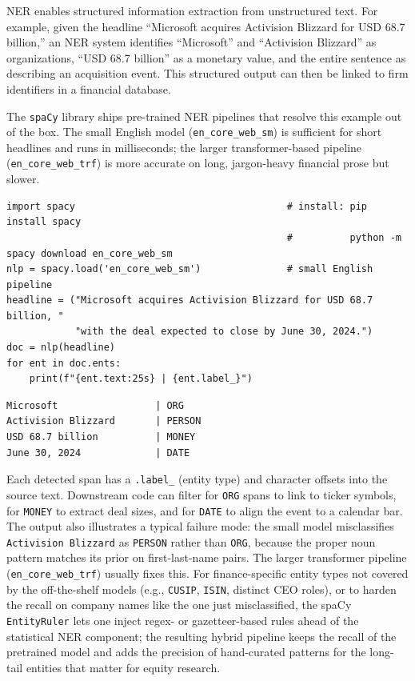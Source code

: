 NER enables structured information extraction from unstructured text. For example, given the headline ``Microsoft acquires Activision Blizzard for USD 68.7 billion,'' an NER system identifies ``Microsoft'' and ``Activision Blizzard'' as organizations, ``USD 68.7 billion'' as a monetary value, and the entire sentence as describing an acquisition event. This structured output can then be linked to firm identifiers in a financial database.

The \texttt{spaCy} library ships pre-trained NER pipelines that resolve this example out of the box. The small English model (\texttt{en\_core\_web\_sm}) is sufficient for short headlines and runs in milliseconds; the larger transformer-based pipeline (\texttt{en\_core\_web\_trf}) is more accurate on long, jargon-heavy financial prose but slower.

\begin{verbatim}
import spacy                                     # install: pip install spacy
                                                 #          python -m spacy download en_core_web_sm
nlp = spacy.load('en_core_web_sm')               # small English pipeline
headline = ("Microsoft acquires Activision Blizzard for USD 68.7 billion, "
            "with the deal expected to close by June 30, 2024.")
doc = nlp(headline)
for ent in doc.ents:
    print(f"{ent.text:25s} | {ent.label_}")
\end{verbatim}

\begin{verbatim}
Microsoft                 | ORG
Activision Blizzard       | PERSON
USD 68.7 billion          | MONEY
June 30, 2024             | DATE
\end{verbatim}

Each detected span has a \texttt{.label\_} (entity type) and character offsets into the source text. Downstream code can filter for \texttt{ORG} spans to link to ticker symbols, for \texttt{MONEY} to extract deal sizes, and for \texttt{DATE} to align the event to a calendar bar. The output also illustrates a typical failure mode: the small model misclassifies \texttt{Activision Blizzard} as \texttt{PERSON} rather than \texttt{ORG}, because the proper noun pattern matches its prior on first-last-name pairs. The larger transformer pipeline (\texttt{en\_core\_web\_trf}) usually fixes this. For finance-specific entity types not covered by the off-the-shelf models (e.g., \texttt{CUSIP}, \texttt{ISIN}, distinct CEO roles), or to harden the recall on company names like the one just misclassified, the spaCy \texttt{EntityRuler} lets one inject regex- or gazetteer-based rules ahead of the statistical NER component; the resulting hybrid pipeline keeps the recall of the pretrained model and adds the precision of hand-curated patterns for the long-tail entities that matter for equity research.


